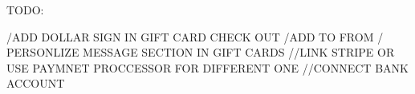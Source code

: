 TODO:

/ADD DOLLAR SIGN IN GIFT CARD CHECK OUT
/ADD TO FROM / PERSONLIZE MESSAGE SECTION IN GIFT CARDS 
//LINK STRIPE OR USE PAYMNET PROCCESSOR FOR DIFFERENT ONE 
//CONNECT BANK ACCOUNT 